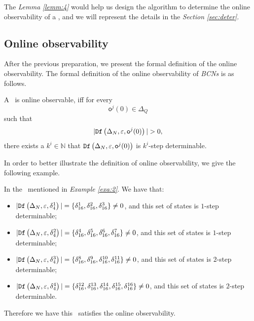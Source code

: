 The {\em Lemma \ref{lemm:4}} would help us design the algorithm to determine the online observability of a \BCN, and we will represent the details in the {\em Section \ref{sec:deter}}.


\subsection{Online observability}
After the previous preparation, we present the formal definition of the online observability. The formal definition of the online observability of {\em BCNs} is as follows.

\begin{definition}
 A \BCN\ is online observable,
iff for every \[\mathsf{o}^{j}(0)\in \Delta_Q\] such that \[|\Ded\left(\Delta_N,\varepsilon, \mathsf{o}^{j}(0)\right)|> 0,\] there exists a $k^{i}\in \mathbb{N}$ that ${\tt Df}\left(\Delta_N,\varepsilon,\mathsf{o}^{j}(0)\right)$ is $k^{i}$-step determinable.
\end{definition}


 In order to better illustrate the definition of online observability, we give the following example.

\begin{example}
In the \BCN\ mentioned in {\em Example \ref{exa:2}}.  We have that:
 \begin{itemize}
 \item $|{\tt Df}\left(\Delta_N,\varepsilon, \delta_{4}^1\right)|=\{\delta_{16}^1,\delta_{16}^2,\delta_{16}^3\}\neq 0$, and this set of states is $1$-step determinable;
 \item $|{\tt Df}\left(\Delta_N,\varepsilon, \delta_{4}^2\right)|=\{\delta_{16}^4,\delta_{16}^5,\delta_{16}^6,\delta_{16}^7\}\neq 0$, and this set of states is $1$-step determinable;
 \item $|{\tt Df}\left(\Delta_N,\varepsilon, \delta_{4}^3\right)|=\{\delta_{16}^8,\delta_{16}^9,\delta_{16}^{10},\delta_{16}^{11}\}\neq 0$, and this set of states is $2$-step determinable;
 \item $|{\tt Df}\left(\Delta_N,\varepsilon, \delta_{4}^4\right)|=\{\delta_{16}^{12},\delta_{16}^{13},\delta_{16}^{14},\delta_{16}^{15},\delta_{16}^{16}\}\neq 0$, and this set of states is $2$-step determinable.
 \end{itemize}
 
Therefore we have this \BCN\ satisfies the online observability.
\end{example}  

